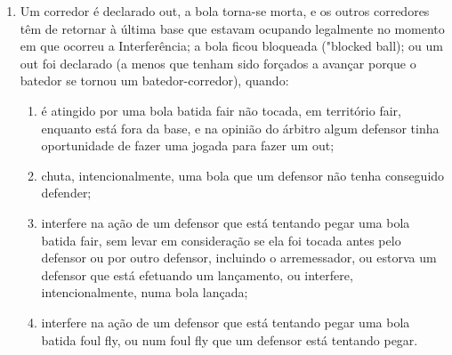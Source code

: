 \begin{enumerate}[label=(\alph*)]
\begin{enumerate}[label=\roman*.]
		\begin{enumerate}[label=\arabic*)]
			\item for feita uma jogada sobre ele ou outro corredor (uma simulação de toque é considerada uma jogada);
			\item o arremessador não está mais dentro do Círculo do Arremessador, com a bola na mão; ou
			\item o arremessador efetua um arremesso ao batedor.
		\end{enumerate}
		\item Uma base por \glspl{ball} ou um terceiro \gls{strike} não agarrado em que o corredor é autorizado a correr é tratado da mesma forma que uma bola batida. O batedor-corredor pode continuar avançando após ultrapassar a primeira base, e é autorizado a correr em direção à segunda base, desde  que ele não pare na primeira base. Se ele parar após ultrapassar a primeira base fazendo uma curva, terá de retornar à base, ou continuar  avançando à segunda base, imediatamente; e
		\item  o batedor-corredor é declarado \gls{out} por ter interferido numa jogada no \gls{homeplate} para tentar evitar uma eliminação evidente de um corredor  que esteja avançando para \gls{home}. O corredor que está avançando é declarado \gls{out} e os outros corredores têm de retornar à última base que  estavam ocupando no momento do arremesso.
	\end{enumerate}

	\item  Um corredor é declarado \gls{out}, a bola torna-se morta, e os outros corredores
	têm de retornar à última base que estavam ocupando legalmente no momento em que ocorreu a Interferência; a bola ficou bloqueada ("\gls{blocked ball}); ou um \gls{out} foi declarado (a menos que tenham sido forçados a avançar porque o batedor se tornou um batedor-corredor), quando:

	\begin{enumerate}[label=\roman*.]
		\item é atingido por uma bola batida \gls{fair} não tocada, em território \gls{fair}, enquanto está fora da base, e na opinião do árbitro algum defensor tinha oportunidade de fazer uma jogada para fazer um \gls{out};
		\item chuta, intencionalmente, uma bola que um defensor não tenha conseguido defender;
		\item interfere na ação de um defensor que está tentando pegar uma bola batida \gls{fair}, sem levar em consideração se ela foi tocada antes pelo defensor ou por outro defensor, incluindo o arremessador, ou estorva um defensor que está efetuando um lançamento, ou interfere, intencionalmente, numa bola lançada;
		\item interfere na ação de um defensor que está tentando pegar uma bola batida \gls{foul fly}, ou num \gls{foul fly} que um defensor está tentando pegar.


\end{enumerate}
\end{enumerate}
